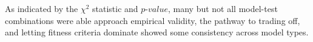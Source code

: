 As indicated by the $\chi^{2}$ statistic and $p$-$value$, many but not all model-test combinations were able approach empirical validity, the pathway to trading off, and letting fitness criteria dominate showed some consistency across model types.
















